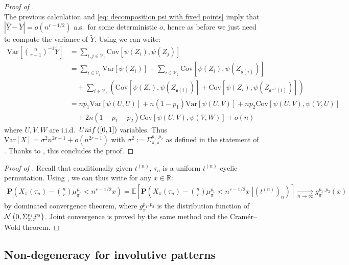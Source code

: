 \documentclass{article}
\theoremstyle{remark}
\def\R{\mathbb{R}}
\def\m{\!-\!}
\newcommand{\cv}[2]{\underset{#1\to#2}{\longrightarrow}}
\newcommand{\card}[1]{\left|#1\right|}
\newcommand{\mean}[1]{\mathbb{E}\left[#1\right]}
\newcommand{\prob}[1]{\mathbf{P}\left(#1\right)}
\newcommand{\var}[1]{\mathrm{Var}\left[#1\right]}
\newcommand{\cov}[2]{\mathrm{Cov}\left[#1,#2\right]}
\newcommand{\Unif}[1]{{\rm Unif}\left(#1\right)}
\newcommand{\Normal}[2]{{\cal N}\left(#1 , #2\right)}
\def\Vert{\mathcal{V}}
\def\s{\mathfrak{s}}
\begin{document}
\begin{proof}[Proof of ]
\begin{equation*}
    \end{equation*}
    The previous calculation and \eqref{eq: decomposition psi with fixed points} imply that $\card{\hat Y - \widetilde Y} = o(n^{r-1/2})$ a.s.~for some deterministic $o$, hence as before we just need to compute the variance of $\widetilde Y$.
    Using  we can write:
    \begin{align*}
        \var{\binom{n}{r\m 1}^{-1}\widetilde Y}
        &= \sum_{i,j\in \Vert_t} \cov{\psi(Z_i)}{\psi(Z_j)}
        \\&= \sum_{i\in \Vert_t} \var{\psi(Z_i)}
        + \sum_{i\in \Vert_2} \cov{\psi(Z_i)}{\psi(Z_{\s(i)})}
        \\&\quad+ \sum_{i\in \Vert_3} \left( \cov{\psi(Z_i)}{\psi(Z_{\s(i)})} + \cov{\psi(Z_i)}{\psi(Z_{\s^{-1}(i)})} \right)
        \\&= n p_1\var{\psi(U,U)}
        + n(1\m p_1)\var{\psi(U,V)}
        + n p_2\cov{\psi(U,V)}{\psi(V,U)}
        \\&\quad+ 2n(1\m p_1\m p_2)\cov{\psi(U,V)}{\psi(V,W)} + o(n) 
    \end{align*}
    where $U,V,W$ are i.i.d.~$\Unif{[0,1]}$ variables.
    Thus $\var{X}=\sigma^2 n^{2r-1} + o(n^{2r-1})$ with $\sigma^2 := \Sigma_{\pi,\pi}^{p_1,p_2}$ as defined in the statement of .
    Thanks to , this concludes the proof.
\end{proof}

\begin{proof}[Proof of ]
    Recall that conditionally given $t^{(n)}$, $\tau_n$ is a uniform $t^{(n)}$-cyclic permutation.
    Using , we can thus write for any $x\in\R$:
    \begin{align*}
        \prob{ X_\pi(\tau_n) - \binom{n}{r}\mu_\pi^{p_1} < n^{r-1/2}x }
        = \mean{ \prob{\left. X_\pi(\tau_n) - \binom{n}{r}\mu_\pi^{p_1} < n^{r-1/2}x \;\right| \left(t^{(n)}\right)_n }}
        \cv{n}{\infty} g_\pi^{p_1,p_2}(x)
    \end{align*}
    by dominated convergence theorem, where $g_\pi^{p_1,p_2}$ is the distribution function of $\Normal{0}{\Sigma_{\pi,\pi}^{p_1,p_2}}$.
    Joint convergence is proved by the same method and the Cram\'er--Wold theorem.
\end{proof}


\subsection{Non-degeneracy for involutive patterns}
\end{document}
